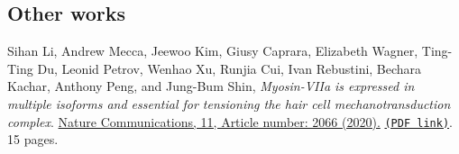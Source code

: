 \subsection*{Other works}

\begin{etaremune}
	\renewcommand{\labelenumi}{[\theenumi]}
	\item
	Sihan Li, Andrew Mecca, Jeewoo Kim, Giusy Caprara, Elizabeth Wagner, Ting-Ting Du, Leonid Petrov, Wenhao Xu, Runjia Cui, Ivan Rebustini, Bechara Kachar, Anthony Peng, and Jung-Bum Shin,
	\emph{Myosin-VIIa is expressed in multiple isoforms and essential for tensioning the hair cell mechanotransduction complex}.
	\href{https://www.nature.com/articles/s41467-020-15936-z}{Nature Communications, 11, Article number: 2066 (2020).} \href{https://storage.lpetrov.cc/papers/nature-comm.pdf}{\texttt{(PDF link)}}. 15 pages.
\end{etaremune}

